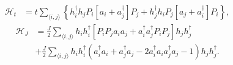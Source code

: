 \documentclass[%
 reprint,
 amsmath,amssymb,
 aps, onecolumn,
prl,
]{revtex4-1}
\newcommand{\mean}[1]{\langle#1\rangle}
\begin{document}
{\color{red}
\begin{equation}
	\begin{split}
	\mathcal{H}_{t} &= t \sum_{\mean{i,j}} \left\{h_i^\dag h_j P_i \left[ a_i + a_j^\dag \right] P_j + h_j^\dag h_i P_j \left[a_j + a_i^\dag \right] P_i \right\},
	\end{split}
	\label{eq:ht}
\end{equation}
%
\begin{equation}
	\begin{aligned}
	\mathcal{H}_{J} &= \frac{J}{2}\sum_{\mean{i,j}} h_i h_i^\dag \left[P_i P_j a_i a_j + a_i^\dag a_j^\dag P_i P_j \right] h_j h_j^\dag \\
	&+ \frac{J}{2} \sum_{\mean{i,j}} h_i h_i^\dag \left(a_i^\dag a_i + a_j^\dag a_j - 2 a_i^\dag a_i a_j^\dag a_j - 1\right) h_j h_j^\dag.
	\end{aligned}
	\label{eq:hj}
\end{equation}
}
\end{document}
